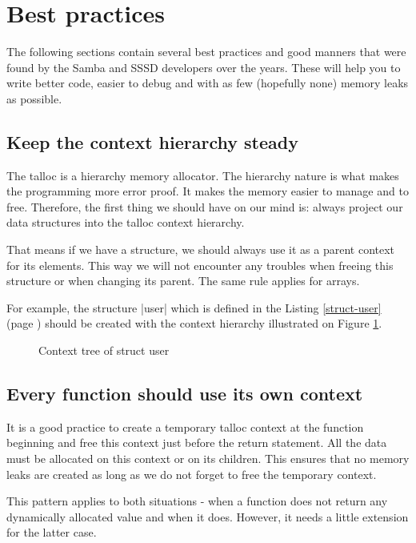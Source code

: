\section{Best practices}
\label{talloc:sec:best-practices}

The following sections contain several best practices and good manners that were
found by the Samba and SSSD developers over the years. These will help you to
write better code, easier to debug and with as few (hopefully none) memory
leaks as possible.

\subsection{Keep the context hierarchy steady}

The talloc is a hierarchy memory allocator. The hierarchy nature is what makes
the programming more error proof. It makes the memory easier to manage and
to free. Therefore, the first thing we should have on our mind is: always
project our data structures into the talloc context hierarchy.

That means if we have a structure, we should always use it as a parent context
for its elements. This way we will not encounter any troubles when freeing this
structure or when changing its parent. The same rule applies for arrays.

For example, the structure |user| which is defined in the Listing
\ref{struct-user} (page \pageref{struct-user}) should be created with the
context hierarchy illustrated on Figure \ref{fig:bp-context-tree}.

\begin{figure}[H]
  \centering
  
  \caption{Context tree of struct user}
  \label{fig:bp-context-tree}
\end{figure}

\subsection{Every function should use its own context}
\label{talloc:subsec:function-use-own-context}

It is a good practice to create a temporary talloc context at the function
beginning and free this context just before the return statement. All the data
must be allocated on this context or on its children. This ensures that no
memory leaks are created as long as we do not forget to free the temporary
context.

This pattern applies to both situations - when a function does not return any
dynamically allocated value and when it does. However, it needs a little
extension for the latter case.


